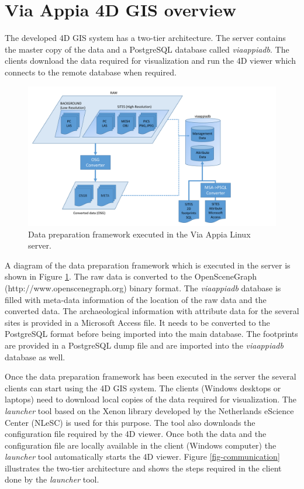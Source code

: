 \documentclass[a4paper,11pt]{article}
\begin{document}
\section{Via Appia 4D GIS overview}
\label{sec:overview}
The developed 4D GIS system has a two-tier architecture. The server contains the master copy of the data and a PostgreSQL database called \textit{viaappiadb}. The clients download the data required for visualization and run the 4D viewer which connects to the remote database when required.

\begin{figure}[!ht]
\centering
\includegraphics[scale=0.5]{fig/server_diagram.pdf}
\caption{Data preparation framework executed in the Via Appia Linux server.}
\label{fig-serverdiagram}
\end{figure}

A diagram of the data preparation framework which is executed in the server is shown in Figure \ref{fig-serverdiagram}. The raw data is converted to the OpenSceneGraph (http://www.openscenegraph.org) binary format. The \textit{viaappiadb} database is filled with meta-data information of the location of the raw data and the converted data. The archaeological information with attribute data for the several sites is provided in a Microsoft Access file. It needs to be converted to the PostgreSQL format before being imported into the main database. The footprints are provided in a PostgreSQL dump file and are imported into the \textit{viaappiadb} database as well.

Once the data preparation framework has been executed in the server the several clients can start using the 4D GIS system. The clients (Windows desktops or laptops) need to download local copies of the data required for visualization. The \textit{launcher} tool based on the Xenon library developed by the Netherlands eScience Center (NLeSC) is used for this purpose. The tool also downloads the configuration file required by the 4D viewer. Once both the data and the configuration file are locally available in the client (Windows computer) the \textit{launcher} tool automatically starts the 4D viewer. Figure  \ref{fig-communication} illustrates the two-tier architecture and shows the steps required in the client done by the \textit{launcher} tool. 
\end{document}

